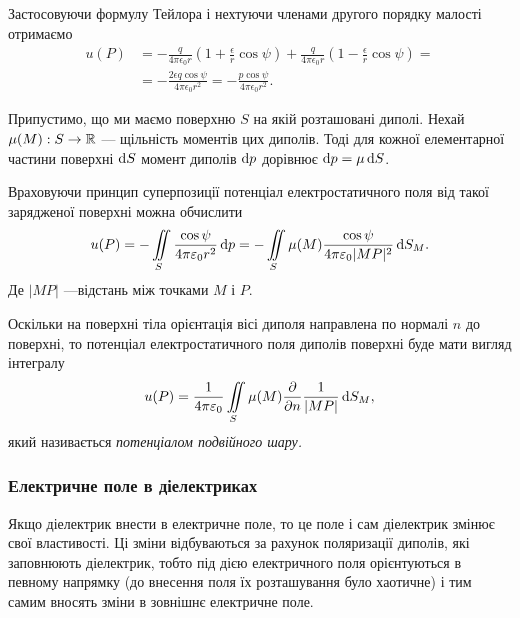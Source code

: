 Застосовуючи формулу Тейлора і нехтуючи членами другого порядку малості отримаємо
\begin{equation}
	\begin{aligned}
		u(P) &= -\frac{q}{4\pi\epsilon_0 r} \left( 1 + \frac{\epsilon}{r}\cos\psi\right) + \frac{q}{4\pi\epsilon_0 r} \left( 1 - \frac{\epsilon}{r}\cos\psi\right) = \\
		&= -\frac{2\epsilon q\cos \psi}{4\pi\epsilon_0 r^2} = - \frac{p\cos\psi}{4\pi\epsilon_0 r^2}.
	\end{aligned}
\end{equation}

Припустимо, що ми маємо поверхню $S$ на якій розташовані диполі. Нехай $\mu(M): S \to \mathbb{R}$ --- щільність моментів цих диполів. Тоді для кожної елементарної частини поверхні $\mathop{}\!\mathrm{d} S$ момент диполів $\mathop{}\!\mathrm{d} p$ дорівнює $\mathop{}\!\mathrm{d} p = \mu \mathop{}\!\mathrm{d} S$. \medskip

Враховуючи принцип суперпозиції потенціал електростатичного поля від такої зарядженої поверхні можна обчислити
\begin{equation}
	u(P) = -\displaystyle\iint\limits_S \frac{\cos\psi}{4\pi\varepsilon_0 r^2} \mathop{}\!\mathrm{d} p = - \displaystyle\iint\limits_S \mu(M) \frac{\cos\psi}{4\pi\varepsilon_0 |MP|^2} \mathop{}\!\mathrm{d} S_M.
\end{equation}
Де $|MP|$ ---відстань між точками $M$ і $P$. 

\begin{definition}
	Оскільки на поверхні тіла орієнтація вісі диполя направлена по нормалі $n$ до поверхні, то потенціал електростатичного поля диполів поверхні буде мати вигляд інтегралу
	\begin{equation}
		u(P) = \frac{1}{4 \pi \varepsilon_0} \displaystyle\iint\limits_S \mu(M) \frac{\partial}{\partial n} \frac{1}{|MP|} \mathop{}\!\mathrm{d} S_M,
	\end{equation}
	який називається \it{потенціалом подвійного шару}.
\end{definition}

\subsubsection{Електричне поле в діелектриках}

Якщо діелектрик внести в електричне поле, то це поле і сам діелектрик змінює свої властивості. Ці зміни відбуваються за рахунок поляризації диполів, які заповнюють діелектрик, тобто під дією електричного поля орієнтуються в певному напрямку (до внесення поля їх розташування було хаотичне) і тим самим вносять зміни в зовнішнє електричне поле. 

